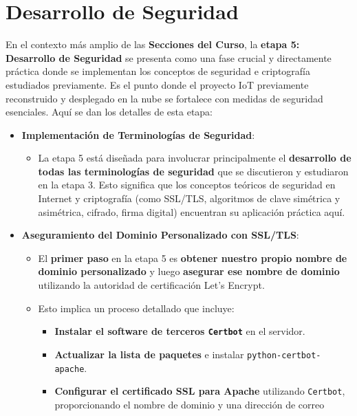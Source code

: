 \documentclass{report}
\begin{document}
\section{Desarrollo de Seguridad}
En el contexto más amplio de las \textbf{Secciones del Curso}, la \textbf{etapa 5: Desarrollo de Seguridad} se presenta como una fase crucial y 
directamente práctica donde se implementan los conceptos de seguridad e criptografía estudiados previamente. Es el punto donde el proyecto IoT 
previamente reconstruido y desplegado en la nube se fortalece con medidas de seguridad esenciales. Aquí se dan los detalles de esta etapa:

\begin{itemize}
    \item \textbf{Implementación de Terminologías de Seguridad}:
    \begin{itemize}
        \item La etapa 5 está diseñada para involucrar principalmente el \textbf{desarrollo de todas las terminologías de seguridad} que se 
        discutieron y estudiaron en la etapa 3. Esto significa que los conceptos teóricos de seguridad en Internet y criptografía (como SSL/TLS, 
        algoritmos de clave simétrica y asimétrica, cifrado, firma digital) encuentran su aplicación práctica aquí.
    \end{itemize}
    \item \textbf{Aseguramiento del Dominio Personalizado con SSL/TLS}:
    \begin{itemize}
        \item El \textbf{primer paso} en la etapa 5 es \textbf{obtener nuestro propio nombre de dominio personalizado} y luego \textbf{asegurar 
        ese nombre de dominio} utilizando la autoridad de certificación Let's Encrypt.
        \item Esto implica un proceso detallado que incluye:
        \begin{itemize}
            \item \textbf{Instalar el software de terceros \texttt{Certbot}} en el servidor.
            \item \textbf{Actualizar la lista de paquetes} e instalar \texttt{python-certbot-apache}.
            \item \textbf{Configurar el certificado SSL para Apache} utilizando \texttt{Certbot}, proporcionando el nombre de dominio y una dirección 
            de correo
        \end{itemize}
    \end{itemize}

\end{itemize}
\end{document}
